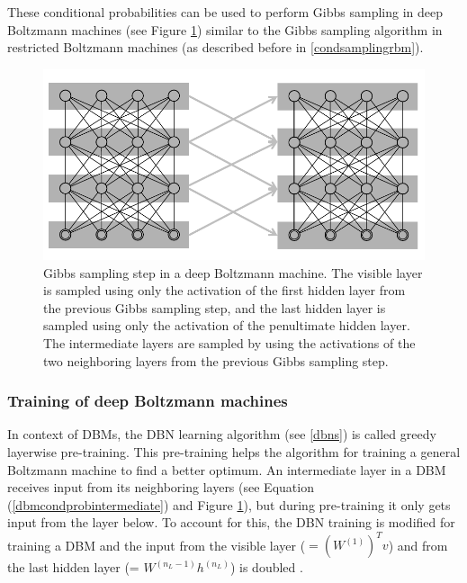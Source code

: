 \documentclass[12pt]{article}
\begin{document}
These conditional probabilities can be used to perform Gibbs sampling in deep Boltzmann machines (see Figure \ref{fig:dbmsampling}) similar to the Gibbs sampling algorithm in restricted Boltzmann machines (as described before in \ref{condsamplingrbm}).

\begin{figure}[h]
   \centering
   \includegraphics[scale=1.0]{images/dbmsampling.pdf}
   \caption{Gibbs sampling step in a deep Boltzmann machine. The visible layer is sampled using only the activation of the first hidden layer from the previous Gibbs sampling step, and the last hidden layer is sampled using only the activation of the penultimate hidden layer. The intermediate layers are sampled by using the activations of the two neighboring layers from the previous Gibbs sampling step. }
   \label{fig:dbmsampling}
 \end{figure}


\subsubsection{Training of deep Boltzmann machines}\label{dbmtraining}


In context of DBMs, the DBN learning algorithm (see \ref{dbns}) is called greedy layerwise pre-training.
This pre-training helps the algorithm for training a general Boltzmann machine to find a better optimum.
An intermediate layer in a DBM receives input from its neighboring layers (see Equation (\ref{dbmcondprobintermediate}) and Figure \ref{fig:dbmsampling}), but during pre-training it only gets input from the layer below. To account for this, the DBN training is modified for training a DBM and the input from the visible layer ($ = (W^{(1)})^T v$) and from the last hidden layer (= $W^{(n_L-1)} h^{(n_L)}$) is doubled
\citep{salakhutdinov2009DBMs}.
\end{document}
